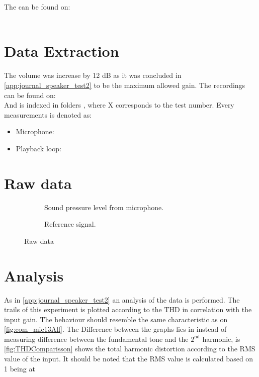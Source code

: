 The  can be found on:\\
\\

\section{Data Extraction}
The volume was increase by 12 dB as it was concluded in \autoref{app:journal_speaker_test2} to be the maximum allowed gain.
The recordings can be found on:\\
And is indexed in folders , where X corresponds to the test number. Every measurements is denoted as:
\begin{itemize}
\item Microphone: 
\item Playback loop: 
\end{itemize}


\section{Raw data}

\begin{figure}[H]
\centering
\begin{subfigure}[t]{0.45\textwidth}
    \centering
    
    \caption{Sound pressure level from microphone.}
    \label{fig:raw1t3_mic1}
\end{subfigure}
\begin{subfigure}[t]{0.45\textwidth}
    \centering
    
    \caption{Reference signal.}
    \label{fig:raw1t3_reference1}
\end{subfigure}
\caption{Raw data}
\label{fig:raw1t3}
\end{figure} 


\section{Analysis}

As in \autoref{app:journal_speaker_test2} an analysis of the data is performed. The trails of this experiment is plotted according to the THD in correlation with the input gain. The behaviour should resemble the same characteristic as on \autoref{fig:com_mic13All}. The Difference between the graphs lies in instead of measuring difference between the fundamental tone and the $\text{2}^{\text{nd}}$ harmonic, is \autoref{fig:THDComparisson} shows the total harmonic distortion according to the RMS value of the input. It should be noted that the RMS value is calculated based on 1 being at 


